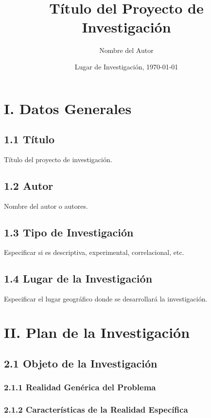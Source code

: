 \documentclass[12pt]{../componentes/uns}
\title{Título del Proyecto de Investigación}
\author{Nombre del Autor}
\date{Lugar de Investigación, \today}
\begin{document}
\maketitle
\newpage

\section*{I. Datos Generales}

\subsection*{1.1 Título}
Título del proyecto de investigación.

\subsection*{1.2 Autor}
Nombre del autor o autores.

\subsection*{1.3 Tipo de Investigación}
Especificar si es descriptiva, experimental, correlacional, etc.

\subsection*{1.4 Lugar de la Investigación}
Especificar el lugar geográfico donde se desarrollará la investigación.

\section*{II. Plan de la Investigación}

\subsection*{2.1 Objeto de la Investigación}
\subsubsection*{2.1.1 Realidad Genérica del Problema}
\lipsum[1] %

\subsubsection*{2.1.2 Características de la Realidad Específica}
\lipsum[2] %
\end{document}
